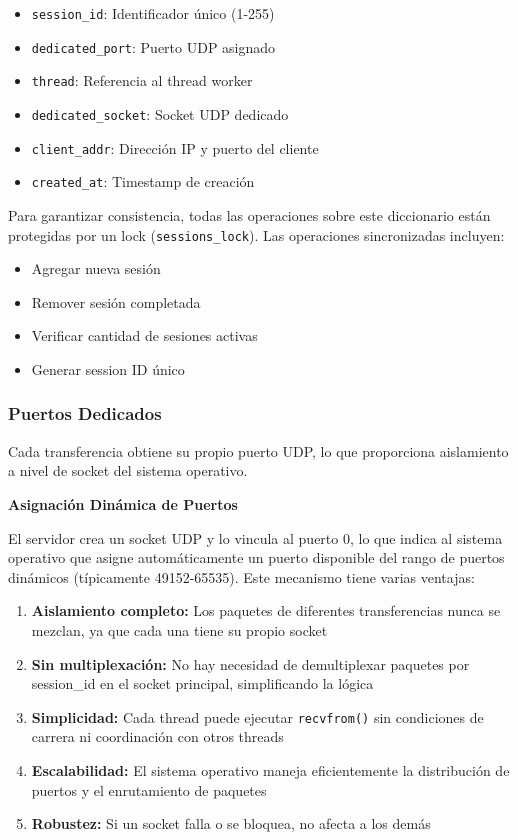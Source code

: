\begin{itemize}
    \item \texttt{session\_id}: Identificador único (1-255)
    \item \texttt{dedicated\_port}: Puerto UDP asignado
    \item \texttt{thread}: Referencia al thread worker
    \item \texttt{dedicated\_socket}: Socket UDP dedicado
    \item \texttt{client\_addr}: Dirección IP y puerto del cliente
    \item \texttt{created\_at}: Timestamp de creación
\end{itemize}

Para garantizar consistencia, todas las operaciones sobre este diccionario están protegidas por un lock (\texttt{sessions\_lock}). Las operaciones sincronizadas incluyen:

\begin{itemize}
    \item Agregar nueva sesión
    \item Remover sesión completada
    \item Verificar cantidad de sesiones activas
    \item Generar session ID único
\end{itemize}

\subsubsection{Puertos Dedicados}

Cada transferencia obtiene su propio puerto UDP, lo que proporciona aislamiento a nivel de socket del sistema operativo.

\textbf{Asignación Dinámica de Puertos}

El servidor crea un socket UDP y lo vincula al puerto 0, lo que indica al sistema operativo que asigne automáticamente un puerto disponible del rango de puertos dinámicos (típicamente 49152-65535). Este mecanismo tiene varias ventajas:

\begin{enumerate}
    \item \textbf{Aislamiento completo:} Los paquetes de diferentes transferencias nunca se mezclan, ya que cada una tiene su propio socket

    \item \textbf{Sin multiplexación:} No hay necesidad de demultiplexar paquetes por session\_id en el socket principal, simplificando la lógica

    \item \textbf{Simplicidad:} Cada thread puede ejecutar \texttt{recvfrom()} sin condiciones de carrera ni coordinación con otros threads

    \item \textbf{Escalabilidad:} El sistema operativo maneja eficientemente la distribución de puertos y el enrutamiento de paquetes

    \item \textbf{Robustez:} Si un socket falla o se bloquea, no afecta a los demás
\end{enumerate}

